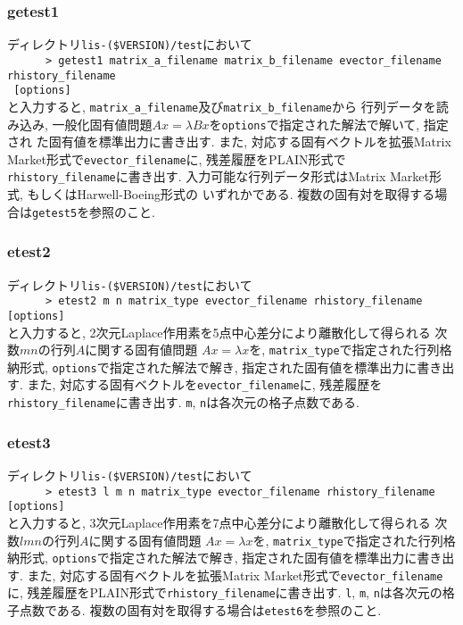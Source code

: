 \documentclass[a4paper]{jarticle}
\begin{document}
{{\subsubsection{getest1}
ディレクトリ{\tt lis-(\$VERSION)/test}において\\
 \verb+      > getest1 matrix_a_filename matrix_b_filename evector_filename rhistory_filename +\\
\verb+ [options]+\\
と入力すると, {\tt matrix\_a\_filename}及び{\tt matrix\_b\_filename}から
行列データを読み込み, 
一般化固有値問題$Ax=\lambda Bx$を{\tt options}で指定された解法で解いて, 指定され
た固有値を標準出力に書き出す. また, 対応する固有ベクトルを拡張Matrix
 Market形式で{\tt evector\_filename}に, 残差履歴をPLAIN形式で
{\tt rhistory\_filename}に書き出す. 
入力可能な行列データ形式はMatrix Market形式, もしくはHarwell-Boeing形式の
いずれかである. 
複数の固有対を取得する場合は{\tt getest5}を参照のこと.

\subsubsection{etest2}
ディレクトリ{\tt lis-(\$VERSION)/test}において\\
 \verb+      > etest2 m n matrix_type evector_filename rhistory_filename [options]+\\
と入力すると, 2次元Laplace作用素を5点中心差分により離散化して得られる
次数$mn$の行列$A$に関する固有値問題
$Ax=\lambda x$を, \verb|matrix_type|で指定された行列格納形式, 
{\tt options}で指定された解法で解き, 指定された固有値を標準出力に書き出す. 
また, 
対応する固有ベクトルを{\tt evector\_filename}に, 残差履歴を{\tt rhistory\_filename}に書き出す. 
{\tt m}, {\tt n}は各次元の格子点数である. 

\subsubsection{etest3}
ディレクトリ{\tt lis-(\$VERSION)/test}において\\
 \verb+      > etest3 l m n matrix_type evector_filename rhistory_filename [options]+\\
と入力すると, 3次元Laplace作用素を7点中心差分により離散化して得られる
次数$lmn$の行列$A$に関する固有値問題
$Ax=\lambda x$を, \verb|matrix_type|で指定された行列格納形式, 
{\tt options}で指定された解法で解き, 指定された固有値を標準出力に書き出す. 
また, 対応する固有ベクトルを拡張Matrix Market形式で{\tt evector\_filename}に, 
残差履歴をPLAIN形式で{\tt rhistory\_filename}に書き出す. 
{\tt l}, {\tt m}, {\tt n}は各次元の格子点数である.
複数の固有対を取得する場合は{\tt etest6}を参照のこと.

}}
\end{document}
